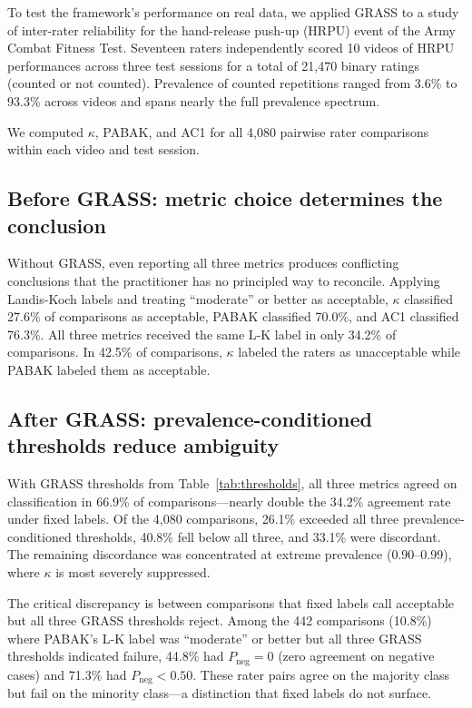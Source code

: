 \documentclass[11pt]{article}
\begin{document}
To test the framework's performance on real data, we applied GRASS to a study of inter-rater reliability for the hand-release push-up (HRPU) event of the Army Combat Fitness Test. Seventeen raters independently scored 10 videos of HRPU performances across three test sessions for a total of 21,470 binary ratings (counted or not counted). Prevalence of counted repetitions ranged from 3.6\% to 93.3\% across videos and spans nearly the full prevalence spectrum.

We computed $\kappa$, PABAK, and AC1 for all 4,080 pairwise rater comparisons within each video and test session.

\subsection*{Before GRASS: metric choice determines the conclusion}

Without GRASS, even reporting all three metrics produces conflicting conclusions that the practitioner has no principled way to reconcile. Applying Landis-Koch labels and treating ``moderate'' or better as acceptable, $\kappa$ classified 27.6\% of comparisons as acceptable, PABAK classified 70.0\%, and AC1 classified 76.3\%. All three metrics received the same L-K label in only 34.2\% of comparisons. In 42.5\% of comparisons, $\kappa$ labeled the raters as unacceptable while PABAK labeled them as acceptable.

\subsection*{After GRASS: prevalence-conditioned thresholds reduce ambiguity}

With GRASS thresholds from Table~\ref{tab:thresholds}, all three metrics agreed on classification in 66.9\% of comparisons---nearly double the 34.2\% agreement rate under fixed labels. Of the 4,080 comparisons, 26.1\% exceeded all three prevalence-conditioned thresholds, 40.8\% fell below all three, and 33.1\% were discordant. The remaining discordance was concentrated at extreme prevalence (0.90--0.99), where $\kappa$ is most severely suppressed.

The critical discrepancy is between comparisons that fixed labels call acceptable but all three GRASS thresholds reject. Among the 442 comparisons (10.8\%) where PABAK's L-K label was ``moderate'' or better but all three GRASS thresholds indicated failure, 44.8\% had $P_{\text{neg}} = 0$ (zero agreement on negative cases) and 71.3\% had $P_{\text{neg}} < 0.50$. These rater pairs agree on the majority class but fail on the minority class---a distinction that fixed labels do not surface.
\end{document}
